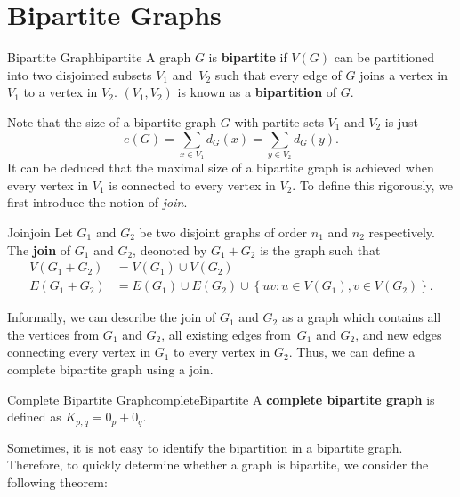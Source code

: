 \documentclass[math]{amznotes}
\theoremstyle{remark}
\begin{document}
\section{Bipartite Graphs}
\begin{dfnbox}{Bipartite Graph}{bipartite}
    A graph $G$ is {\color{red} \textbf{bipartite}} if $V(G)$ can be partitioned into two disjointed subsets $V_1$ and~$V_2$ such that every edge of $G$ joins a vertex in $V_1$ to a vertex in $V_2$. $(V_1, V_2)$ is known as a {\color{red} \textbf{bipartition}} of $G$.
\end{dfnbox}
Note that the size of a bipartite graph $G$ with partite sets $V_1$ and $V_2$ is just
\begin{equation*}
    e(G) = \sum_{x \in V_1}d_G(x) = \sum_{y \in V_2}d_G(y).
\end{equation*}
It can be deduced that the maximal size of a bipartite graph is achieved when every vertex in $V_1$ is connected to every vertex in $V_2$. To define this rigorously, we first introduce the notion of \textit{join}.
\begin{dfnbox}{Join}{join}
    Let $G_1$ and $G_2$ be two disjoint graphs of order $n_1$ and $n_2$ respectively. The {\color{red} \textbf{join}} of $G_1$ and $G_2$, deonoted by $G_1 + G_2$ is the graph such that
    \begin{align*}
        V(G_1 + G_2) & = V(G_1) \cup V(G_2) \\
        E(G_1 + G_2) & = E(G_1) \cup E(G_2) \cup \left\{uv \colon u \in V(G_1), v \in V(G_2)\right\}.
    \end{align*}
\end{dfnbox}
Informally, we can describe the join of $G_1$ and $G_2$ as a graph which contains all the vertices from $G_1$ and $G_2$, all existing edges from~$G_1$ and $G_2$, and new edges connecting every vertex in $G_1$ to every vertex in $G_2$. Thus, we can define a complete bipartite graph using a join.
\begin{dfnbox}{Complete Bipartite Graph}{completeBipartite}
    A {\color{red} \textbf{complete bipartite graph}} is defined as $K_{p, q} = 0_p + 0_q$.
\end{dfnbox}
Sometimes, it is not easy to identify the bipartition in a bipartite graph. Therefore, to quickly determine whether a graph is bipartite, we consider the following theorem:
\end{document}
